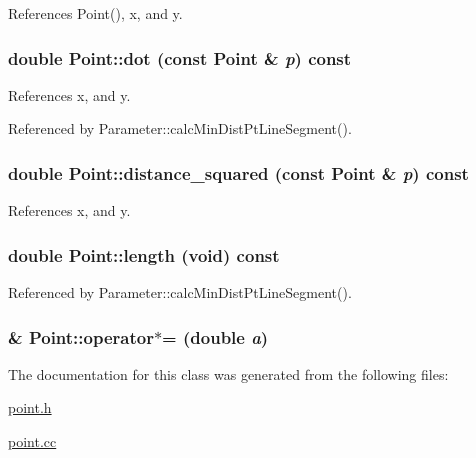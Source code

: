 References Point(), x, and y.\hypertarget{classPoint_a51050f8b9868c12b1a9d063e8555d05}{
\subsubsection[dot]{\setlength{\rightskip}{0pt plus 5cm}double Point::dot (const {\bf Point} \& {\em p}) const}}
\label{classPoint_a51050f8b9868c12b1a9d063e8555d05}




References x, and y.

Referenced by Parameter::calcMinDistPtLineSegment().\hypertarget{classPoint_99717644bf38e3868c9ff7f32f4a9226}{
\subsubsection[distance\_\-squared]{\setlength{\rightskip}{0pt plus 5cm}double Point::distance\_\-squared (const {\bf Point} \& {\em p}) const}}
\label{classPoint_99717644bf38e3868c9ff7f32f4a9226}




References x, and y.\hypertarget{classPoint_41052067de2f7e0be2bf0b60c1e7f60d}{
\subsubsection[length]{\setlength{\rightskip}{0pt plus 5cm}double Point::length (void) const}}
\label{classPoint_41052067de2f7e0be2bf0b60c1e7f60d}




Referenced by Parameter::calcMinDistPtLineSegment().\hypertarget{classPoint_aed1420449367308540f3459049ac2bd}{
\subsubsection[operator$\ast$=]{\& Point::operator$\ast$= (double {\em a})}}
\label{classPoint_aed1420449367308540f3459049ac2bd}




The documentation for this class was generated from the following files:\begin{CompactItemize}
\item 
\hyperlink{point_8h}{point.h}\item 
\hyperlink{point_8cc}{point.cc}\end{CompactItemize}
